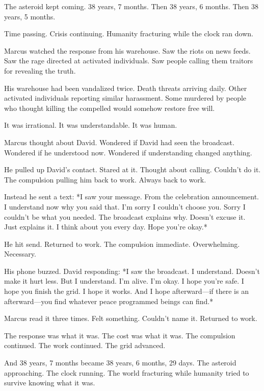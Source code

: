 The asteroid kept coming. 38 years, 7 months. Then 38 years, 6 months. Then 38 years, 5 months.

Time passing. Crisis continuing. Humanity fracturing while the clock ran down.

\scenebreak

Marcus watched the response from his warehouse. Saw the riots on news feeds. Saw the rage directed at activated individuals. Saw people calling them traitors for revealing the truth.

His warehouse had been vandalized twice. Death threats arriving daily. Other activated individuals reporting similar harassment. Some murdered by people who thought killing the compelled would somehow restore free will.

It was irrational. It was understandable. It was human.

Marcus thought about David. Wondered if David had seen the broadcast. Wondered if he understood now. Wondered if understanding changed anything.

He pulled up David's contact. Stared at it. Thought about calling. Couldn't do it. The compulsion pulling him back to work. Always back to work.

Instead he sent a text: *I saw your message. From the celebration announcement. I understand now why you said that. I'm sorry I couldn't choose you. Sorry I couldn't be what you needed. The broadcast explains why. Doesn't excuse it. Just explains it. I think about you every day. Hope you're okay.*

He hit send. Returned to work. The compulsion immediate. Overwhelming. Necessary.

His phone buzzed. David responding: *I saw the broadcast. I understand. Doesn't make it hurt less. But I understand. I'm alive. I'm okay. I hope you're safe. I hope you finish the grid. I hope it works. And I hope afterward—if there is an afterward—you find whatever peace programmed beings can find.*

Marcus read it three times. Felt something. Couldn't name it. Returned to work.

The response was what it was. The cost was what it was. The compulsion continued. The work continued. The grid advanced.

And 38 years, 7 months became 38 years, 6 months, 29 days. The asteroid approaching. The clock running. The world fracturing while humanity tried to survive knowing what it was.

\scenebreak

